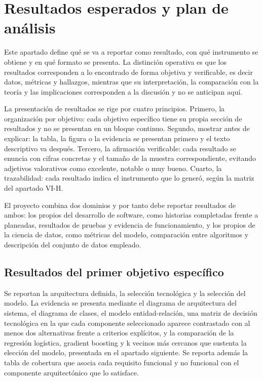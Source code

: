 \documentclass[conference]{IEEEtran}
\begin{document}
\section{Resultados esperados y plan de análisis}
Este apartado define qué se va a reportar como resultado, con qué instrumento se obtiene y en qué formato se presenta. La distinción operativa es que los resultados corresponden a lo encontrado de forma objetiva y verificable, es decir datos, métricas y hallazgos, mientras que su interpretación, la comparación con la teoría y las implicaciones corresponden a la discusión y no se anticipan aquí.

La presentación de resultados se rige por cuatro principios. Primero, la organización por objetivo: cada objetivo específico tiene su propia sección de resultados y no se presentan en un bloque continuo. Segundo, mostrar antes de explicar: la tabla, la figura o la evidencia se presentan primero y el texto descriptivo va después. Tercero, la afirmación verificable: cada resultado se enuncia con cifras concretas y el tamaño de la muestra correspondiente, evitando adjetivos valorativos como excelente, notable o muy bueno. Cuarto, la trazabilidad: cada resultado indica el instrumento que lo generó, según la matriz del apartado VI-H.

El proyecto combina dos dominios y por tanto debe reportar resultados de ambos: los propios del desarrollo de software, como historias completadas frente a planeadas, resultados de pruebas y evidencia de funcionamiento, y los propios de la ciencia de datos, como métricas del modelo, comparación entre algoritmos y descripción del conjunto de datos empleado.

\subsection{Resultados del primer objetivo específico}
Se reportan la arquitectura definida, la selección tecnológica y la selección del modelo. La evidencia se presenta mediante el diagrama de arquitectura del sistema, el diagrama de clases, el modelo entidad-relación, una matriz de decisión tecnológica en la que cada componente seleccionado aparece contrastado con al menos dos alternativas frente a criterios explícitos, y la comparación de la regresión logística, gradient boosting y k vecinos más cercanos que sustenta la elección del modelo, presentada en el apartado siguiente. Se reporta además la tabla de cobertura que asocia cada requisito funcional y no funcional con el componente arquitectónico que lo satisface.
\end{document}
